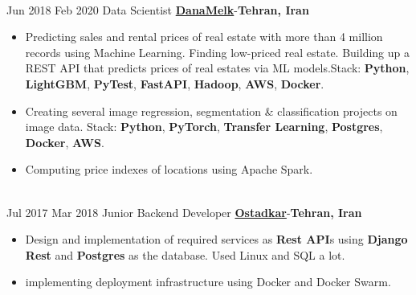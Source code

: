 \documentclass[letterpaper]{DS_class_file} %
\begin{document}
\begin{twenty}
{\begin{itemize}
		\end{itemize}}
		\\
	\twentyitem
		{Jun 2018}
		{Feb 2020}
		{\hspace{0.3cm}Data Scientist}
		{\href{https://www.linkedin.com/company/danamelk/people/}{\textbf{DanaMelk}}-\textbf{Tehran, Iran}}
		{}
		{\begin{itemize}
            \item Predicting sales and rental prices of real estate with more than 4 million records using Machine Learning. Finding low-priced real estate. Building up a REST API that predicts prices of real estates via ML models.\newline Stack: \textbf{Python}, \textbf{LightGBM}, \textbf{PyTest}, \textbf{FastAPI}, \textbf{Hadoop}, \textbf{AWS}, \textbf{Docker}.
			\item Creating several image regression, segmentation \& classification projects on image data. \newline Stack: \textbf{Python}, \textbf{PyTorch}, \textbf{Transfer Learning}, \textbf{Postgres}, \textbf{Docker}, \textbf{AWS}.
                \item Computing price indexes of locations using Apache Spark.
      

                
		\end{itemize}}
		\\
	\twentyitem
		{Jul 2017}
		{Mar 2018}
		{\hspace{0.3cm} Junior Backend Developer}
		{\href{https://www.linkedin.com/company/ostadkar/about/}{\textbf{Ostadkar}}-\textbf{Tehran, Iran}}
		{}
		{\begin{itemize}
			\item Design and implementation of required services as \textbf{Rest API}s 
using \textbf{Django Rest} and \textbf{Postgres} as the database. Used Linux and SQL a lot.
\item implementing deployment infrastructure using Docker and Docker Swarm. 

		\end{itemize}}
		\\

\end{twenty}
\end{document}
